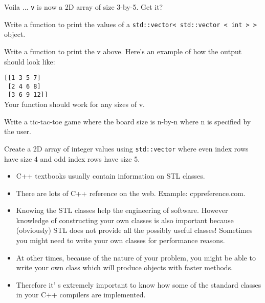 Voila ... \verb!v! is now a 2D array of size 3-by-5. Get it?

\begin{ex} Write a function to print the values of a \verb!std::vector< std::vector < int > >! object.
\end{ex}
\begin{ex} Write a function to print the v above. Here's an
example of how the output should look like:

\verb![[1 3 5 7]!\\
\verb! [2 4 6 8]!\\
\verb! [3 6 9 12]]!\\

Your function should work for any sizes of v.
\end{ex}
\begin{ex} Write a tic-tac-toe game where the board size is
n-by-n where n is specified by the user.
\end{ex}
\begin{ex}
Create a 2D array of integer values using \texttt{std::vector}
where even index rows have size 4 and odd index rows have size 5.
\end{ex}
\newpage{}

\begin{itemize}
\item
  C++ textbooks usually contain information on STL classes.
\item
  There are lots of C++ reference on the web. Example: cppreference.com.
\item
  Knowing the STL classes help the engineering of software.
  However knowledge of constructing your own classes is also important because (obviously) STL does not provide all the possibly useful classes! Sometimes you might need to write your own classes for performance reasons.
\item
  At other times, because of the nature of your problem, you might be
  able to write your own class which will produce objects with faster
  methods.
\item
  Therefore it' s extremely important to know how some of
  the standard classes in your C++ compilers are implemented.
\end{itemize}


